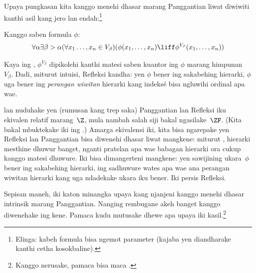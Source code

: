 \documentclass[../../../include/open-logic-section]{subfiles}
\begin{document}

Upaya pungkasan kita kanggo menehi dhasar
marang Panggantian liwat \stagesinex diwiwiti
kanthi asil kang jero lan endah:\footnote{Elinga:
kabeh formula bisa ngemot parameter (kajaba yen
diandharake kanthi cetha kosokbaline).}
\begin{thm}
Kanggo saben formula $\phi$:
\[
\forall \alpha \exists \beta > \alpha (\forall x_1 \ldots, x_n \in
V_\beta)(\phi(x_1, \ldots, x_n) \liff \phi^{V_\beta}(x_1, \ldots, x_n))
\]
\end{thm}
\noindent 
Kaya ing ,
$\phi^{V_\beta}$ dipikolehi kanthi matesi
saben kuantor ing $\phi$ marang himpunan~$V_\beta$.
Dadi, miturut intuisi, Refleksi kandha:
yen $\phi$ bener ing sakabehing hierarki,
$\phi$ uga bener ing \emph{perangan wiwitan}
hierarki kang indeksé bisa ngluwihi ordinal
apa wae.

\citet{Montague1961} lan \citet{Levy1960}
nuduhake yen (rumusan kang trep saka)
Panggantian lan Refleksi iku ekivalen relatif
marang~$\Z$, mula nambah salah siji bakal
ngasilake~$\ZF$. (Kita bakal mbuktekake iki
ing .)
Amarga ekivalensi iki, kita bisa ngarepake
yen Refleksi lan Panggantian bisa diwenehi
dhasar liwat \stagesinex{} mangkene: miturut
\stagesinex, hierarki mesthine dhuwur banget,
nganti pratelan apa wae babagan hierarki ora
cukup kanggo matesi dhuwure. Iki bisa
dimangerteni mangkene: yen sawijining
ukara~$\phi$ bener ing sakabehing hierarki,
ing sadhuwure wates apa wae ana perangan
wiwitan hierarki kang uga ndadekake ukara iku
bener.
Iki persis Refleksi.

Sepisan maneh, iki katon minangka upaya kang
njanjeni kanggo menehi dhasar intrinsik marang
Panggantian. Nanging rembugane akeh banget
kanggo diwenehake ing kene. Pamaca kudu
mutusake dhewe apa upaya iki kasil.\footnote{Kanggo
nerusake, pamaca bisa maca
\citet[95--100]{Incurvati2020}.}
\end{document}
